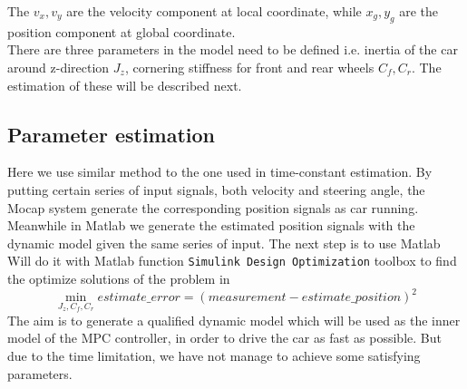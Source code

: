 The $v_x,v_y$ are the velocity component at local coordinate, while $x_g, y_g$ are the position component at global coordinate.\\
There are three parameters in the model need to be defined i.e.  inertia of the car around z-direction $J_z$, cornering stiffness for front and rear wheels $C_f, C_r$. The estimation of these will be described next.

\subsection{Parameter estimation}

Here we use similar method to the one used in time-constant estimation. By putting certain series of input signals, both velocity and steering angle, the Mocap system generate the corresponding position signals as car running. Meanwhile in Matlab we generate the estimated position signals with the dynamic model given the same series of input.
The next step is to use Matlab
Will do it with Matlab function \texttt{Simulink Design Optimization} toolbox to find the optimize solutions of the problem in
\begin{equation}
  \min_{J_z, C_f, C_r} estimate\_error = (measurement - estimate\_position)^2
\end{equation}
The aim is to generate a qualified dynamic model which will be used as the inner model of the MPC controller, in order to drive the car as fast as possible. But due to the time limitation, we have not manage to achieve some satisfying parameters.
